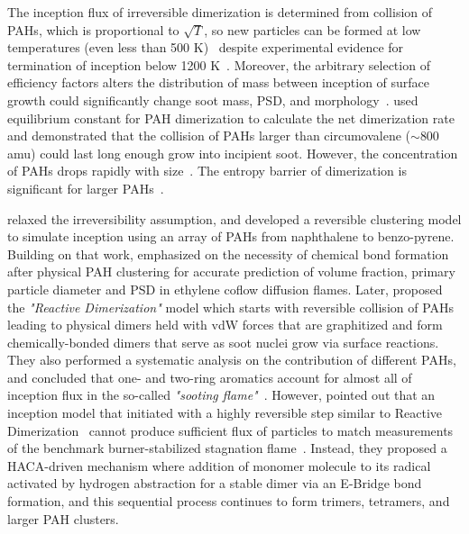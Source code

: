  

The inception flux of irreversible dimerization is determined from collision of PAHs, which is proportional to $\sqrt{T}$, so new particles can be formed at low temperatures (even less than 500 K)~\citep{naseri2022simulating} despite experimental evidence for termination of inception below 1200 K~\citep{sanchez2012polycyclic, cho2016synthesis}. Moreover, the arbitrary selection of efficiency factors alters the distribution of mass between inception of surface growth could significantly change soot mass, PSD, and morphology~\citep{saffaripour2014experimental}. \citet{miller1991kinetics} used equilibrium constant for PAH dimerization to calculate the net dimerization rate and demonstrated that the collision of PAHs larger than circumovalene ($\sim$800 amu) could last long enough grow into incipient soot. However, the concentration of PAHs drops rapidly with size~\citep{Wang2011}. The entropy barrier of dimerization is significant for larger PAHs~\citep{giordana2011theoretical}.  


\citet{eaves2015importance} relaxed the irreversibility assumption, and developed a reversible clustering model to simulate inception using an array of PAHs from naphthalene to benzo-pyrene. Building on that work, \citet{kholghy2019role} emphasized on the necessity of chemical bond formation after physical PAH clustering for accurate prediction of volume fraction, primary particle diameter and PSD in ethylene coflow diffusion flames. Later, \citet{kholghy2018reactive} proposed the \textit{"Reactive Dimerization"} model which starts with reversible collision of PAHs leading to physical dimers held with vdW forces that are graphitized and form chemically-bonded dimers that serve as soot nuclei grow via surface reactions. They also performed a systematic analysis on the contribution of different PAHs, and concluded that one- and two-ring aromatics account for almost all of inception flux in the so-called \textit{"sooting flame"}~\citep{desgroux2017comparative}. However, \citet{frenklach2020mechanism} pointed out that an inception model that initiated with a highly reversible step similar to Reactive Dimerization~\citep{kholghy2018reactive} cannot produce sufficient flux of particles to match measurements of the benchmark burner-stabilized stagnation flame~\citep{abid2009quantitative}. Instead, they proposed a HACA-driven mechanism where addition of monomer molecule to its radical activated by hydrogen abstraction for a stable dimer via an E-Bridge bond formation, and this sequential process continues to form trimers, tetramers, and larger PAH clusters.

